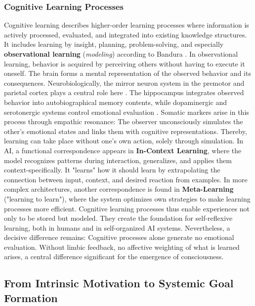 \subsubsection*{Cognitive Learning Processes}

Cognitive learning describes higher-order learning processes where information is actively processed, evaluated, and integrated into existing knowledge structures.
It includes learning by insight, planning, problem-solving, and especially \textbf{observational learning} (\emph{modeling}) according to Bandura \cite{Bandura1977}.
In observational learning, behavior is acquired by perceiving others without having to execute it oneself.
The brain forms a mental representation of the observed behavior and its consequences.
Neurobiologically, the mirror neuron system in the premotor and parietal cortex plays a central role here \cite{Rizzolatti2004}.
The hippocampus integrates observed behavior into autobiographical memory contents, while dopaminergic and serotonergic systems control emotional evaluation \cite{Iacoboni2009}.
Somatic markers arise in this process through empathic resonance: The observer unconsciously simulates the other's emotional states and links them with cognitive representations.
Thereby, learning can take place without one's own action, solely through simulation.
In AI, a functional correspondence appears in \textbf{In-Context Learning}, where the model recognizes patterns during interaction, generalizes, and applies them context-specifically.
It "learns" how it should learn by extrapolating the connection between input, context, and desired reaction from examples.
In more complex architectures, another correspondence is found in \textbf{Meta-Learning} ("learning to learn"), where the system optimizes own strategies to make learning processes more efficient.
Cognitive learning processes thus enable experiences not only to be stored but modeled.
They create the foundation for self-reflexive learning, both in humans and in self-organized AI systems.
Nevertheless, a decisive difference remains: Cognitive processes alone generate no emotional evaluation.
Without limbic feedback, no affective weighting of what is learned arises, a central difference significant for the emergence of consciousness.

\subsection*{From Intrinsic Motivation to Systemic Goal Formation}

